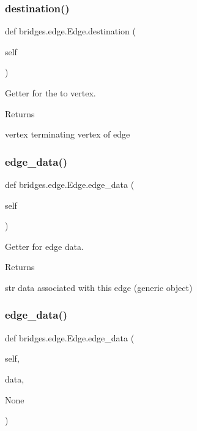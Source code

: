 \subsubsection{\texorpdfstring{destination()}{destination()}}
{\footnotesize\ttfamily def bridges.\+edge.\+Edge.\+destination (\begin{DoxyParamCaption}\item[{}]{self }\end{DoxyParamCaption})}



Getter for the to vertex. 

\begin{DoxyReturn}{Returns}


vertex terminating vertex of edge 
\end{DoxyReturn}
\mbox{\label{classbridges_1_1edge_1_1_edge_abc3f52467d38ad2d7e06113d0c714ed6}} 
\subsubsection{\texorpdfstring{edge\+\_\+data()}{edge\_data()}\hspace{0.1cm}{\footnotesize\ttfamily [1/2]}}
{\footnotesize\ttfamily def bridges.\+edge.\+Edge.\+edge\+\_\+data (\begin{DoxyParamCaption}\item[{}]{self }\end{DoxyParamCaption})}



Getter for edge data. 

\begin{DoxyReturn}{Returns}


str data associated with this edge (generic object) 
\end{DoxyReturn}
\mbox{\label{classbridges_1_1edge_1_1_edge_a7429980b52d754159629c73c316cbc41}} 
\subsubsection{\texorpdfstring{edge\+\_\+data()}{edge\_data()}\hspace{0.1cm}{\footnotesize\ttfamily [2/2]}}
{\footnotesize\ttfamily def bridges.\+edge.\+Edge.\+edge\+\_\+data (\begin{DoxyParamCaption}\item[{}]{self,  }\item[{}]{data,  }\item[{}]{None }\end{DoxyParamCaption})}



